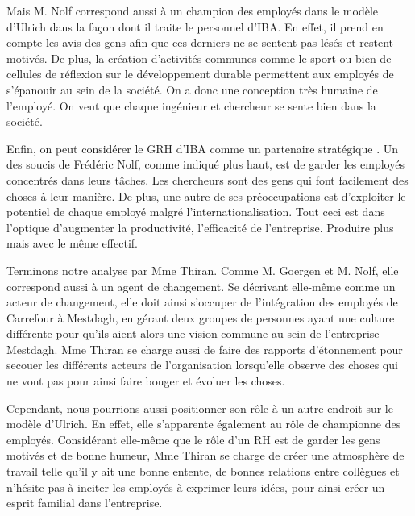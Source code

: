 
Mais M. Nolf correspond aussi à un \og champion des employés \fg{} dans le modèle d'Ulrich dans la façon dont il traite le personnel d'IBA. En effet, il prend en compte les avis des gens afin que ces derniers ne se sentent pas lésés et restent motivés. De plus, la création d'activités communes comme le sport ou bien de cellules de réflexion sur le développement durable permettent aux employés de s'épanouir au sein de la société. On a donc une conception très humaine de l'employé. On veut que chaque ingénieur et chercheur se sente bien dans la société. \newline

Enfin, on peut considérer le GRH d'IBA comme un \og partenaire stratégique \fg{}. Un des soucis de Frédéric Nolf, comme indiqué plus haut, est de garder les employés concentrés dans leurs tâches. Les chercheurs sont des gens qui font facilement des choses à leur manière. De plus, une autre de ses préoccupations est d'exploiter le potentiel de chaque employé malgré l'internationalisation. Tout ceci est dans l'optique d'augmenter la productivité, l'efficacité de l'entreprise. Produire plus mais avec le même effectif.



Terminons notre analyse par Mme Thiran. Comme M. Goergen et M. Nolf, elle correspond aussi à un agent de changement. Se décrivant elle-même comme un acteur de changement, elle doit ainsi s’occuper de l’intégration des employés de Carrefour à Mestdagh, en gérant deux groupes de personnes ayant une culture différente pour qu’ils aient alors une vision commune au sein de l'entreprise Mestdagh. Mme Thiran se charge aussi de faire des rapports d’étonnement pour secouer les différents acteurs de l’organisation lorsqu’elle observe des choses qui ne vont pas pour ainsi faire bouger et évoluer les choses.\newline

Cependant, nous pourrions aussi positionner son rôle à un autre endroit sur le modèle d’Ulrich. En effet, elle s’apparente également au rôle de championne des employés. Considérant elle-même que le rôle d’un RH est de garder les gens motivés et de bonne humeur, Mme Thiran se charge de créer une atmosphère de travail telle qu’il y ait une bonne entente, de bonnes relations entre collègues et n’hésite pas à inciter les employés à exprimer leurs idées, pour ainsi créer un esprit familial dans l’entreprise. 

